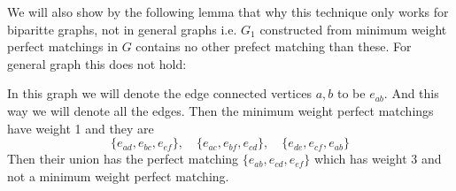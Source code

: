 We will also show by the following lemma that why this technique only works for biparitte graphs, not in general graphs i.e. $G_1$ constructed from minimum weight perfect matchings in $G$ contains no other prefect matching than these. For general graph this does not hold:

\begin{center}
	\begin{minipage}{0.3\textwidth}
		\begin{center}
		\end{center}
	\end{minipage}\hspace{1cm}
	\begin{minipage}{0.6\textwidth}
		In this graph we will denote the edge connected vertices $a,b$ to be $e_{ab}$. And this way we will denote all the edges. Then the minimum weight perfect matchings have weight 1 and they are $$\{e_{ad},e_{bc},e_{ef}\}, \quad \{e_{ac}, e_{bf}, e_{cd}\},\quad \{e_{de}, e_{cf}, e_{ab}\}$$Then their union has the perfect matching $\{e_{ab},e_{cd},e_{ef}\}$ which has weight 3 and not a minimum weight perfect matching.
	\end{minipage}
\end{center}

